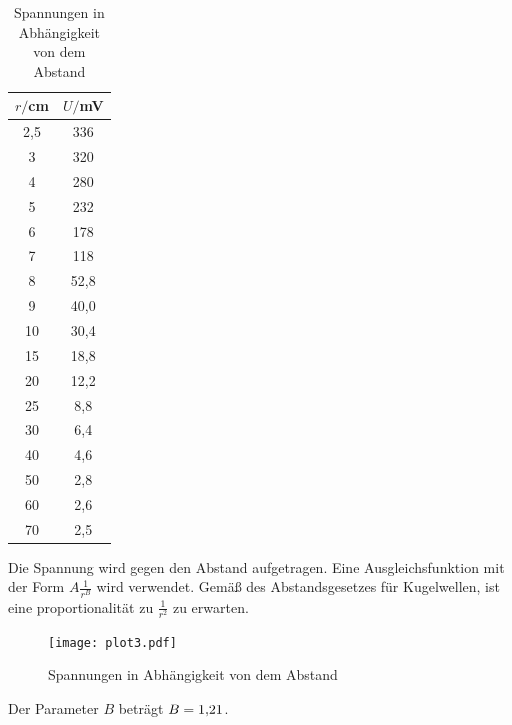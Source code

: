 \begin{table}[H]
  \centering
  \caption{Spannungen in Abhängigkeit von dem Abstand}
  \label{tab:Phase}
  \begin{tabular}{c c}
    \toprule
    $r/$cm  &  $U/$mV \\
    \midrule
     2,5   &    336    \\
     3     &    320    \\
     4     &    280    \\
     5     &    232    \\
     6     &    178    \\
     7     &    118    \\
     8     &    52,8    \\
     9     &    40,0    \\
    10     &    30,4    \\
    15     &    18,8    \\
    20     &    12,2    \\
    25     &    8,8     \\
    30     &    6,4     \\
    40     &    4,6     \\
    50     &    2,8     \\
    60     &    2,6     \\
    70     &    2,5     \\
    \bottomrule
  \end{tabular}
\end{table}

Die Spannung wird gegen den Abstand aufgetragen. Eine Ausgleichsfunktion mit der Form $A \frac{1}{r^B}$ wird verwendet. Gemäß des
Abstandsgesetzes für Kugelwellen, ist eine proportionalität zu $\frac{1}{r^2}$ zu erwarten.

\begin{figure}[H]
  \centering
  \texttt{[image: plot3.pdf]}
  \caption{Spannungen in Abhängigkeit von dem Abstand}
  \label{fig:plot3}
\end{figure}

Der Parameter $B$ beträgt $B= \SI{1.2{1}}{}$.
